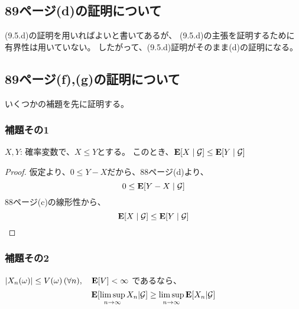     \subsection{89ページ(d)の証明について}
      (9.5.d)の証明を用いればよいと書いてあるが、
      (9.5.d)の主張を証明するために有界性は用いていない。
      したがって、(9.5.d)証明がそのまま(d)の証明になる。

    \subsection{89ページ(f),(g)の証明について}
      いくつかの補題を先に証明する。
      \subsubsection{補題その1}
        \begin{lem}\label{lem1}
          $X,Y$: 確率変数で、$X \leq Y$とする。
          このとき、${\mathbf{E}}[X \mid \mathcal{G}] \leq {\mathbf{E}}[Y \mid \mathcal{G}]$
        \end{lem}

        \begin{proof}
          仮定より、$0 \leq Y - X$だから、88ページ(d)より、
          \[
            0 \leq {\mathbf{E}}[ Y - X \mid \mathcal{G}]
          \]
          88ページ(c)の線形性から、
          \[
            {\mathbf{E}}[X \mid \mathcal{G}] \leq {\mathbf{E}}[Y \mid \mathcal{G}]
          \]
        \end{proof}

      \subsubsection{補題その2}
        \begin{lem}\label{lem2}
          $|X_n(\omega)| \leq V(\omega) \, (\forall n), \quad {\mathbf{E}}[V] < \infty$
          であるなら、
          \[
            {\mathbf{E}}[\limsup_{n \to \infty}X_n | \mathcal{G}] \ge \limsup_{n \to \infty}{\mathbf{E}}[X_n | \mathcal{G}]
          \]
        \end{lem}

